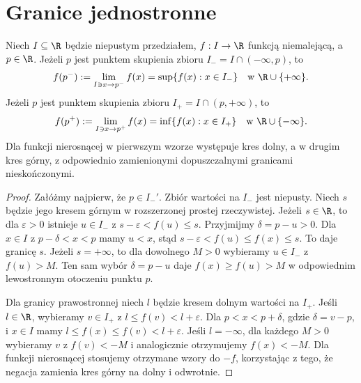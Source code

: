 \section{Granice jednostronne}
\begin{twierdzenie}
\label{ma1:thm:monotone-one-sided}
Niech $I\subseteq\R$ będzie niepustym przedziałem, $f:I\to\R$ funkcją niemalejącą, a $p\in\R$. Jeżeli $p$ jest punktem skupienia zbioru $I_-=I\cap(-\infty,p)$, to
\[
 f(p^-):=\lim_{I\ni x\to p^-}f(x)=\sup\{f(x):x\in I_-\}
 \quad\text{w }\R\cup\{+\infty\}.
\]
Jeżeli $p$ jest punktem skupienia zbioru $I_+=I\cap(p,+\infty)$, to
\[
 f(p^+):=\lim_{I\ni x\to p^+}f(x)=\inf\{f(x):x\in I_+\}
 \quad\text{w }\R\cup\{-\infty\}.
\]
Dla funkcji nierosnącej w pierwszym wzorze występuje kres dolny, a w drugim kres górny, z odpowiednio zamienionymi dopuszczalnymi granicami nieskończonymi.
\end{twierdzenie}
\begin{proof}
Załóżmy najpierw, że $p\in I_-'$. Zbiór wartości na $I_-$ jest niepusty. Niech $s$ będzie jego kresem górnym w rozszerzonej prostej rzeczywistej. Jeżeli $s\in\R$, to dla $\varepsilon>0$ istnieje $u\in I_-$ z $s-\varepsilon<f(u)\le s$. Przyjmijmy $\delta=p-u>0$. Dla $x\in I$ z $p-\delta<x<p$ mamy $u<x$, stąd
$s-\varepsilon<f(u)\le f(x)\le s$.
To daje granicę $s$. Jeżeli $s=+\infty$, to dla dowolnego $M>0$ wybieramy $u\in I_-$ z $f(u)>M$. Ten sam wybór $\delta=p-u$ daje $f(x)\ge f(u)>M$ w odpowiednim lewostronnym otoczeniu punktu $p$.

Dla granicy prawostronnej niech $l$ będzie kresem dolnym wartości na $I_+$. Jeśli $l\in\R$, wybieramy $v\in I_+$ z $l\le f(v)<l+\varepsilon$. Dla $p<x<p+\delta$, gdzie $\delta=v-p$, i $x\in I$ mamy $l\le f(x)\le f(v)<l+\varepsilon$. Jeśli $l=-\infty$, dla każdego $M>0$ wybieramy $v$ z $f(v)<-M$ i analogicznie otrzymujemy $f(x)<-M$. Dla funkcji nierosnącej stosujemy otrzymane wzory do $-f$, korzystając z tego, że negacja zamienia kres górny na dolny i odwrotnie.
\end{proof}

